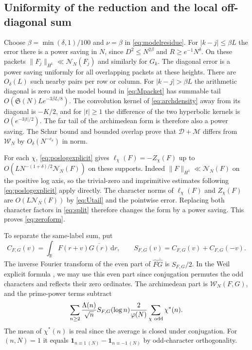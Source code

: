 \documentclass[11pt,a4paper]{article}
\numberwithin{equation}{section}
\newcommand{\SSS}{\mathfrak S}
\newcommand{\ud}{\mathrm d}
\newcommand{\NN}{\mathcal N_N}
\begin{document}
\subsection{Uniformity of the reduction and the local off-diagonal sum}

Choose $\beta=\min(\delta,1)/100$ and $\nu=\beta$ in
\cref{eq:modelresidue}. For $|k-j|\le\beta L$ the error there is
a power saving in $N$, since $D^2\le N^{2\beta}$ and
$R\ge e^{-1}N^\delta$. On these packets
$\|F_j\|_{H^1}\ll\NN(F_j)$ and similarly for $G_k$.
The diagonal error is a power saving uniformly for all overlapping
packets at these heights. There are $O_\delta(L)$ such nearby
pairs per row or column. For $|k-j|>\beta L$ the arithmetic
diagonal is zero and the model bound in \cref{eq:Mpacket}
has summable tail $O(\SSS(N)L e^{-3\beta L/8})$. The convolution
kernel of \cref{eq:archdensity} away from its diagonal is
$-K/2$, and for $|t|\ge1$ the difference of the two hyperbolic
kernels is $O(e^{-3|t|/2})$. The far tail of the archimedean
form is therefore also a power saving. The Schur bound and
bounded overlap prove that $\mathcal D+\mathcal M$ differs from
$\mathcal W_N$ by $O_\delta(N^{-c_\delta})$ in norm.

For each $\chi$, \cref{eq:poslogexplicit} gives
$\ell_\chi(F)=-Z_\chi(F)$ up to
$O(L N^{-(1+\delta)/2}\NN(F))$ on these supports.
Indeed $\|F\|_{H^1}\ll\NN(F)$ on the positive log axis,
so the trivial-zero and imprimitive estimates following
\cref{eq:poslogexplicit} apply directly. The character norms
of $\ell_\chi(F)$ and $Z_\chi(F)$ are $O(L\NN(F))$
by \cref{eq:Utail} and the pointwise error. Replacing both
character factors in \cref{eq:split} therefore changes the
form by a power saving.
This proves \cref{eq:zeroform}.

To separate the same-label sum, put
\[
 C_{F,G}(v)=\int_{\mathbb R}F(r+v)\overline{G(r)}\,\ud r,
 \qquad S_{F,G}(v)=C_{F,G}(v)+C_{F,G}(-v).
\]
The inverse Fourier transform of the even part of
$\widehat F\overline{\widehat G}$ is $S_{F,G}/2$.
In the Weil explicit formula \cite[Section~2]{HughesRudnick},
we may use this even part since conjugation permutes the odd
characters and reflects their zero ordinates.
The archimedean part is $\mathcal W_N(F,G)$, and the
prime-power terms subtract
\[
 \sum_{n\ge2}\frac{\Lambda(n)}{\sqrt n}S_{F,G}(\log n)
      \frac{2}{\varphi(N)}\sum_{\chi\ {\rm odd}}\chi^*(n).
\]
The mean of $\chi^*(n)$ is real since the average is
closed under conjugation. For $(n,N)=1$ it equals
$\mathbf1_{n\equiv1\ (N)}-\mathbf1_{n\equiv-1\ (N)}$
by odd-character orthogonality.
\end{document}
